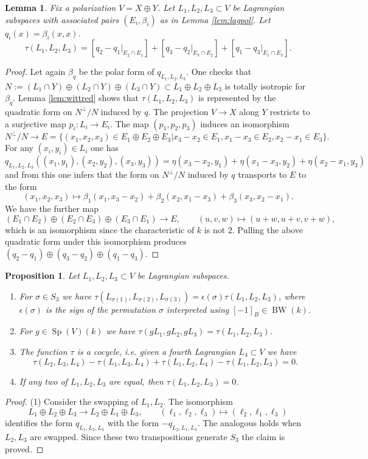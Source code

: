 \documentclass{article}
\DeclareMathOperator{\Sp}{Sp}
\newtheorem{lem}[thm]{Lemma}
\newtheorem{pro}[thm]{Proposition}
\theoremstyle{definition}
\numberwithin{equation}{subsection}
\renewcommand{\-}{\hyp{}}
\DeclareMathOperator{\BW}{BW}
\begin{document}
\begin{appendices}
\begin{lem} \label{lem:maslov_basic2}
	Fix a polarization $V=X \oplus Y$. Let $L_1,L_2,L_3 \subset V$ be Lagrangian subspaces with associated pairs $(E_i,\beta_i)$ as in Lemma \ref{lem:lagpol}. Let $q_i(x)=\beta_i(x,x)$. 
	\[ \tau(L_1,L_2,L_3) = [q_2-q_1|_{E_2 \cap E_1}] + [q_3-q_2|_{E_3 \cap E_2}] + [q_1-q_3|_{E_1 \cap E_3}]. \]
\end{lem}
\begin{proof}
	Let again $\beta_q$ be the polar form of $q_{L_1,L_2,L_3}$. One checks that $N:=(L_1 \cap Y)\oplus (L_2 \cap Y) \oplus (L_3 \cap Y) \subset L_1 \oplus L_2 \oplus L_3$ is totally isotropic for $\beta_q$. Lemma \ref{lem:wittred} shows that $\tau(L_1,L_2,L_3)$ is represented by the quadratic form on $N^\perp/N$ induced by $q$. The projection $V \to X$ along $Y$ restricts to a surjective map $p_i : L_i \to E_i$. The map $(p_1,p_2,p_3)$ induces an isomorphism
	\[ N^\perp/N \to E = \{(x_1,x_2,x_3) \in E_1 \oplus E_2 \oplus E_3|x_3-x_2 \in E_1, x_1-x_3 \in E_2, x_2-x_1 \in E_3\}. \]
	For any $(x_i,y_i) \in L_i$ one has
	\[ q_{L_1,L_2,L_3}((x_1,y_1),(x_2,y_2),(x_3,y_3)) = \eta(x_3-x_2,y_1)+\eta(x_1-x_3,y_2)+\eta(x_2-x_1,y_3)\]
	and from this one infers that the form on $N^\perp/N$ induced by $q$ transports to $E$ to the form 
	\[ (x_1,x_2,x_3) \mapsto \beta_1(x_1,x_3-x_2)+\beta_2(x_2,x_1-x_3)+\beta_3(x_3,x_2-x_1). \]
	We have the further map
	\[  (E_1 \cap E_2) \oplus (E_2 \cap E_3) \oplus (E_3 \cap E_1) \to E,\qquad (u,v,w) \mapsto (u+w,u+v,v+w), \]
	which is an isomorphism since the characteristic of $k$ is not $2$. Pulling the above quadratic form under this isomorphism produces $(q_2-q_1) \oplus (q_3-q_2) \oplus (q_1-q_3)$.
\end{proof}

\begin{pro} \label{pro:maslov_basic}
	Let $L_1,L_2,L_3 \subset V$ be Lagrangian subspaces.
	\begin{enumerate}
		\item For $\sigma \in S_3$ we have $\tau(L_{\sigma(1)},L_{\sigma(2)},L_{\sigma(3)})=\epsilon(\sigma)\tau(L_1,L_2,L_3)$, where $\epsilon(\sigma)$ is the sign of the permutation $\sigma$ interpreted using $[-1]_B \in \BW(k)$.
		\item For $g \in \Sp(V)(k)$ we have $\tau(gL_1,gL_2,gL_3)=\tau(L_1,L_2,L_3)$.
		\item The function $\tau$ is a cocycle, i.e. given a fourth Lagrangian $L_4 \subset V$ we have
		\[ \tau(L_2,L_3,L_4)-\tau(L_1,L_3,L_4)+\tau(L_1,L_2,L_4)-\tau(L_1,L_2,L_3)=0.\]
		\item If any two of $L_1,L_2,L_3$ are equal, then $\tau(L_1,L_2,L_3)=0$.
	\end{enumerate}
\end{pro}
\begin{proof}
	(1) Consider the swapping of $L_1,L_2$. The isomorphism
	\[ L_1 \oplus L_2 \oplus L_3 \to L_2 \oplus L_1 \oplus L_3,\qquad (\ell_1,\ell_2,\ell_3) \mapsto (\ell_2,\ell_1,\ell_3) \]
	identifies the form $q_{L_1,L_2,L_3}$ with the form $-q_{L_2,L_1,L_3}$. The analogous holds when $L_2,L_3$ are swapped. Since these two transpositions generate $S_3$ the claim is proved.


\end{proof}
\end{appendices}
\end{document}

